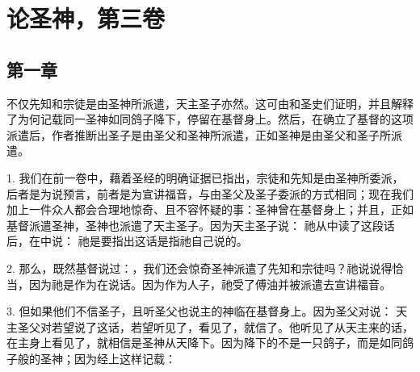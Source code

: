

\section{论圣神，第三卷}


\subsection{第一章}

不仅先知和宗徒是由圣神所派遣，天主圣子亦然。这可由和圣史们证明，并且解释了为何记载同一圣神如同鸽子降下，停留在基督身上。然后，在确立了基督的这项派遣后，作者推断出圣子是由圣父和圣神所派遣，正如圣神是由圣父和圣子所派遣。\par

1. 我们在前一卷中，藉着圣经的明确证据已指出，宗徒和先知是由圣神所委派，后者是为说预言，前者是为宣讲福音，与由圣父及圣子委派的方式相同；现在我们加上一件众人都会合理地惊奇、且不容怀疑的事：圣神曾在基督身上；并且，正如基督派遣圣神，圣神也派遣了天主圣子。因为天主圣子说： 祂从中读了这段话后，在中说：  祂是要指出这话是指祂自己说的。\par

2. 那么，既然基督说过：，我们还会惊奇圣神派遣了先知和宗徒吗？祂说说得恰当，因为祂是作为在说话。因为作为人子，祂受了傅油并被派遣去宣讲福音。\par

3. 但如果他们不信圣子，且听圣父也说主的神临在基督身上。因为圣父对说：  天主圣父对若望说了这话，若望听见了，看见了，就信了。他听见了从天主来的话，在主身上看见了，就相信是圣神从天降下。因为降下的不是一只鸽子，而是如同鸽子般的圣神；因为经上这样记载： \par


